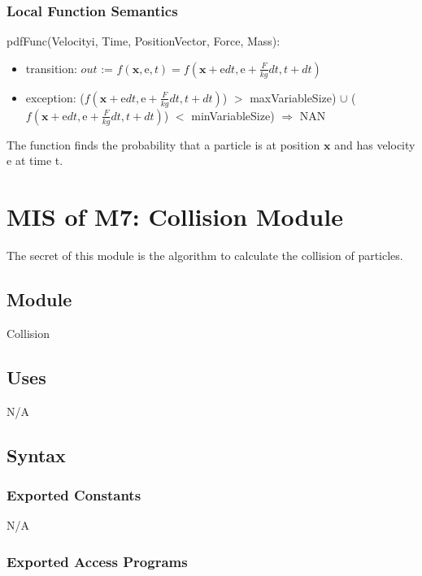 \documentclass[12pt, titlepage]{article}
\begin{document}
\subsubsection{Local Function Semantics}

\noindent pdfFunc(Velocityi, Time, PositionVector, Force, Mass):
\begin{itemize}
	\item transition: $out$ := $f(\mathrm{\textbf{x}},\mathrm{e},t) = f(\mathrm{\textbf{x}} +\mathrm{e}dt, \mathrm{e} + \frac{F}{kg}dt, t + dt)$
	\item exception: ($f(\mathrm{\textbf{x}} +\mathrm{e}dt, \mathrm{e} + \frac{F}{kg}dt, t + dt)$) $>$ maxVariableSize) $\cup$ ($f(\mathrm{\textbf{x}} +\mathrm{e}dt, \mathrm{e} + \frac{F}{kg}dt, t + dt)$) $<$ minVariableSize) $\Rightarrow$ NAN
\end{itemize}

The function finds the probability that a particle is at position $\textbf{x}$ and has velocity $\mathrm{e}$ at time t.\\


\newpage

\section{MIS of M7: Collision Module} \label{COModule} 

The secret of this module is the algorithm to calculate the collision of particles.

\subsection{Module}

Collision

\subsection{Uses}
N/A

\subsection{Syntax}

\subsubsection{Exported Constants}
N/A

\subsubsection{Exported Access Programs}
\end{document}
